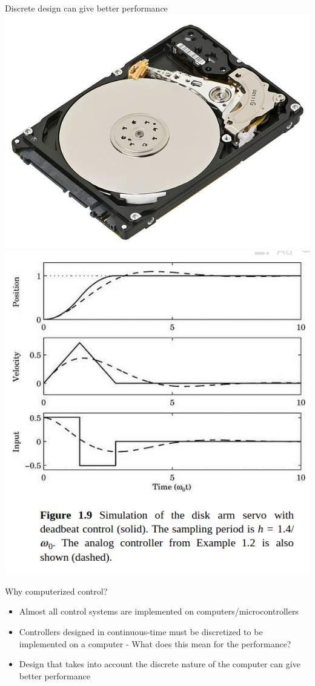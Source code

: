 \documentclass[presentation,aspectratio=169]{beamer}
\begin{document}
\begin{frame}[label=sec-4-2]{Discrete design can give better performance}
\includegraphics[height=0.5\textheight]{../../figures/diskdrive.png}
\includegraphics[height=0.8\textheight]{../../figures/fig1-9.png}
\end{frame}

\begin{frame}[label=sec-4-3]{Why computerized control?}
\begin{itemize}
\item Almost all control systems are implemented on computers/microcontrollers
\item Controllers designed in continuous-time must be discretized to be implemented on a computer - What does this mean for the performance?
\item Design that takes into account the discrete nature of the computer can give better performance
\end{itemize}
\end{frame}
\end{document}
